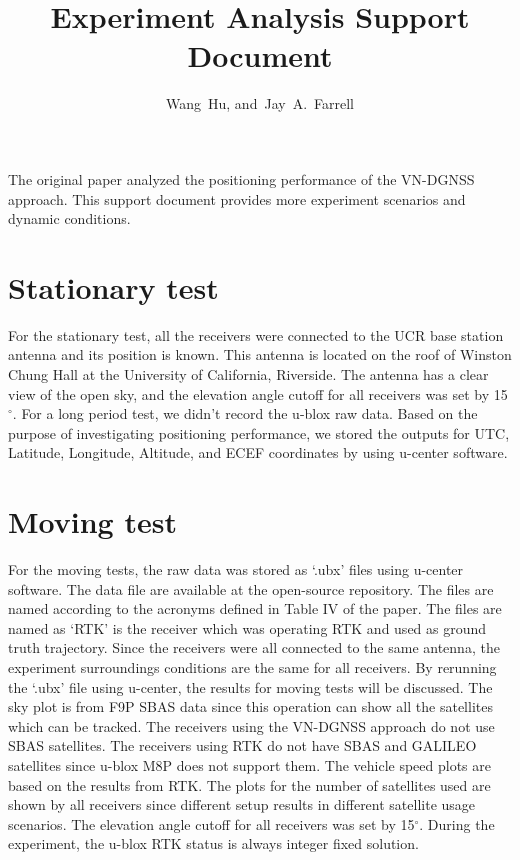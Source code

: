\documentclass[letterpaper, 10 pt,onecolumn]{article}
\begin{document}
	\title{Experiment Analysis Support Document}
	\author{Wang~Hu,
		and~Jay~A.~Farrell
	}
	\maketitle
	
	The original paper analyzed the positioning performance of the VN-DGNSS approach. This support document provides more experiment scenarios and dynamic conditions.
	
	\section{Stationary test}
	For the stationary test, all the receivers were connected to the UCR base station antenna and its position is known. This antenna is located on the roof of Winston Chung Hall at the University of California, Riverside. The antenna has a clear view of the open sky, and the elevation angle cutoff for all receivers was set by 15$^\circ$. For a long period test, we didn't record the u-blox raw data. Based on the purpose of investigating positioning performance, we stored the outputs for UTC, Latitude, Longitude, Altitude, and ECEF coordinates by using u-center software.
	
	\section{Moving test}
	For the moving tests, the raw data was stored as `.ubx' files using u-center software. The data file are available at the open-source repository. The files are named according to the acronyms defined in Table IV of the paper. The files are named as `RTK' is the receiver which was operating RTK and used as ground truth trajectory. Since the receivers were all connected to the same antenna, the experiment surroundings conditions are the same for all receivers. By rerunning the `.ubx' file using u-center, the results for moving tests will be discussed. The sky plot is from F9P SBAS data since this operation can show all the satellites which can be tracked. The receivers using the VN-DGNSS approach do not use SBAS satellites. The receivers using RTK do not have SBAS and GALILEO satellites since u-blox M8P does not support them. The vehicle speed plots are based on the results from RTK. The plots for the number of satellites used are shown by all receivers since different setup results in different satellite usage scenarios. The elevation angle cutoff for all receivers was set by 15$^\circ$. During the experiment, the u-blox RTK status is always integer fixed solution.
	
\end{document}
